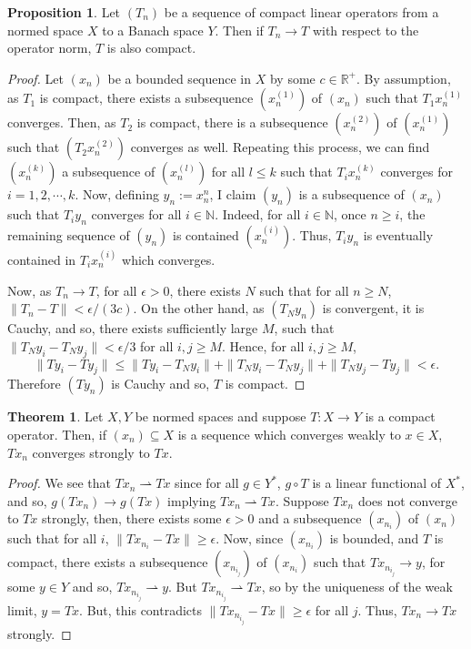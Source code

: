 \documentclass[]{article}
\theoremstyle{definition}
\newtheorem{theorem}{Theorem}
\theoremstyle{definition}
\newtheorem{proposition}{Proposition}[section]
\newcommand{\weak}{\rightharpoonup}
\begin{document}
\begin{proposition}
  Let \((T_n)\) be a sequence of compact linear operators from a normed space 
  \(X\) to a Banach space \(Y\). Then if \(T_n \to T\) with respect to the 
  operator norm, \(T\) is also compact.
\end{proposition}
\begin{proof}
  Let \((x_n)\) be a bounded sequence in \(X\) by some \(c \in \mathbb{R}^+\). 
  By assumption, as \(T_1\) is compact, there exists a subsequence 
  \((x_n^{(1)})\) of \((x_n)\) such that \(T_1 x_n^{(1)}\) converges. Then, 
  as \(T_2\) is compact, there is a subsequence \((x_n^{(2)})\) of \((x_n^{(1)})\)
  such that \((T_2x_n^{(2)})\) converges as well. Repeating this process, we 
  can find \((x_n^{(k)})\) a subsequence of \((x_n^{(l)})\) for all \(l \le k\) 
  such that \(T_i x_n^{(k)}\) converges for \(i = 1, 2, \cdots, k\). Now, defining 
  \(y_n := x_n^n\), I claim \((y_n)\) is a subsequence of \((x_n)\) such that 
  \(T_i y_n\) converges for all \(i \in \mathbb{N}\). Indeed, for all 
  \(i \in \mathbb{N}\), once \(n \ge i\), the remaining sequence of \((y_n)\) 
  is contained \((x_n^{(i)})\). Thus, \(T_i y_n\) is eventually contained in 
  \(T_i x_n^{(i)}\) which converges.

  Now, as \(T_n \to T\), for all \(\epsilon > 0\), there exists \(N\) such that 
  for all \(n \ge N\), \(\|T_n - T\| < \epsilon / (3c)\). On the other hand, 
  as \((T_N y_n)\) is convergent, it is Cauchy, and so, there exists 
  sufficiently large \(M\), such that \(\|T_N y_i - T_N y_j\| < \epsilon / 3\) 
  for all \(i, j \ge M\). Hence, for all \(i, j \ge M\),
  \[\|Ty_i - Ty_j\| \le \|Ty_i - T_N y_i\| + \|T_N y_i - T_N y_j\| + 
    \|T_N y_j - Ty_j\| < \epsilon.\]
  Therefore \((Ty_n)\) is Cauchy and so, \(T\) is compact.
\end{proof}

\begin{theorem}
  Let \(X, Y\) be normed spaces and suppose \(T : X \to Y\) is a compact 
  operator. Then, if \((x_n) \subseteq X\) is a sequence which converges weakly 
  to \(x \in X\), \(T x_n\) converges strongly to \(Tx\).
\end{theorem}
\begin{proof}
  We see that \(Tx_n \weak Tx\) since for all \(g \in Y^*\), \(g \circ T\) is 
  a linear functional of \(X^*\), and so, \(g(Tx_n) \to g(Tx)\) implying 
  \(Tx_n \weak Tx\). Suppose \(Tx_n\) does not converge to \(Tx\) strongly, 
  then, there exists some \(\epsilon > 0\) and a subsequence \((x_{n_i})\) of 
  \((x_n)\) such that for all \(i\), \(\|Tx_{n_i} - Tx\| \ge \epsilon\). 
  Now, since \((x_{n_i})\) is bounded, and \(T\) is compact, there exists a 
  subsequence \((x_{n_{i_j}})\) of \((x_{n_i})\) such that \(Tx_{n_{i_j}} \to 
  y\), for some \(y \in Y\) and so, \(Tx_{n_{i_j}} \weak y\). But 
  \(Tx_{n_{i_j}} \weak Tx\), so by the uniqueness of the weak limit, 
  \(y = Tx\). But, this contradicts \(\|Tx_{n_{i_j}} - Tx\| \ge \epsilon\) 
  for all \(j\). Thus, \(T x_n \to Tx\) strongly.
\end{proof}
\end{document}

